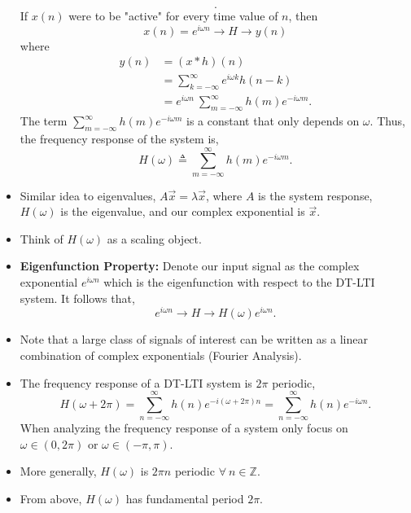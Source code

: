 \begin{itemize}
\[		      .\]
	      If $x(n)$ were to be "active" for every time value of $n$, then
	      \[
		      x(n) = e^{i\omega n} \longrightarrow H \longrightarrow y(n)
	      \]
	      where
	      \begin{align*}
		      y(n) & = (x * h)(n)                                                  \\
		           & = \sum_{k=-\infty}^{\infty} e^{i\omega k}h(n-k)               \\
		           & = e^{i\omega n}\ \sum_{m=-\infty}^{\infty} h(m)e^{-i\omega m}
		      .\end{align*}
	      The term $\sum_{m=-\infty}^{\infty} h(m)e^{-i\omega m}$ is a constant
	      that only depends on $\omega$. Thus, the frequency response of the
	      system is,
	      \begin{equation}
		      H(\omega) \triangleq \sum_{m=-\infty}^{\infty} h(m)e^{-i\omega m}
		      .\end{equation}
	\item Similar idea to eigenvalues, $A \vec{x} = \lambda \vec{x}$,
	      where $A$ is the system response, $H(\omega)$ is the eigenvalue, and
	      our complex exponential is $\vec{x}$.
	\item Think of $H(\omega)$ as a scaling object.
	\item \textbf{Eigenfunction Property:} Denote our input signal as the
	      complex exponential $e^{i\omega n}$ which is the
	      eigenfunction with respect to the DT-LTI system. It follows that,
	      \[
		      e^{i\omega n} \longrightarrow H \longrightarrow H(\omega)e^{i\omega n}
		      .\]
	\item Note that a large class of signals of interest can be written
	      as a linear combination of complex exponentials (Fourier Analysis).
	\item The frequency response of a DT-LTI system is $2\pi$ periodic,
	      \[
		      H(\omega + 2\pi) = \sum_{n=-\infty}^{\infty} h(n)e^{-i(\omega+2\pi)n} = \sum_{n=-\infty}^{\infty} h(n)e^{-i\omega n}
		      .\]
	      When analyzing the frequency response of a system only focus
	      on $\omega \in (0,2\pi)$ or $\omega \in (-\pi, \pi)$.
	\item More generally, $H(\omega)$ is $2\pi n$ periodic $\forall\ n \in \mathbb{Z}$.
	\item From above, $H(\omega)$ has fundamental period $2\pi$.
\end{itemize}
